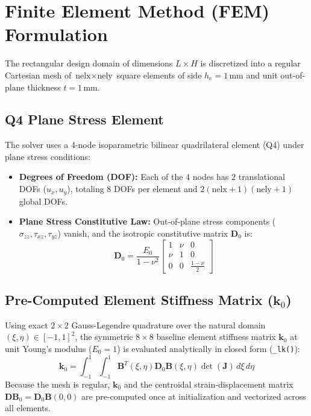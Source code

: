 \documentclass[11pt, a4paper]{article}
\begin{document}
\section{Finite Element Method (FEM) Formulation}
The rectangular design domain of dimensions $L \times H$ is discretized into a regular Cartesian mesh of $\text{nelx} \times \text{nely}$ square elements of side $h_e = 1\,\text{mm}$ and unit out-of-plane thickness $t = 1\,\text{mm}$.

\subsection{Q4 Plane Stress Element}
The solver uses a 4-node isoparametric bilinear quadrilateral element (Q4) under plane stress conditions:
\begin{itemize}
    \item \textbf{Degrees of Freedom (DOF):} Each of the 4 nodes has 2 translational DOFs ($u_x, u_y$), totaling 8 DOFs per element and $2(\text{nelx}+1)(\text{nely}+1)$ global DOFs.
    \item \textbf{Plane Stress Constitutive Law:} Out-of-plane stress components ($\sigma_{zz}, \tau_{xz}, \tau_{yz}$) vanish, and the isotropic constitutive matrix $\mathbf{D}_0$ is:
    \begin{equation}
        \mathbf{D}_0 = \frac{E_0}{1 - \nu^2}
        \begin{bmatrix}
        1 & \nu & 0 \\
        \nu & 1 & 0 \\
        0 & 0 & \frac{1-\nu}{2}
        \end{bmatrix}
    \end{equation}
\end{itemize}

\subsection{Pre-Computed Element Stiffness Matrix ($\mathbf{k}_0$)}
Using exact $2 \times 2$ Gauss-Legendre quadrature over the natural domain $(\xi, \eta) \in [-1, 1]^2$, the symmetric $8 \times 8$ baseline element stiffness matrix $\mathbf{k}_0$ at unit Young's modulus ($E_0 = 1$) is evaluated analytically in closed form (\texttt{\_lk()}):
\begin{equation}
    \mathbf{k}_0 = \int_{-1}^1 \int_{-1}^1 \mathbf{B}^T(\xi,\eta) \mathbf{D}_0 \mathbf{B}(\xi,\eta) \det(\mathbf{J}) \, d\xi \, d\eta
\end{equation}
Because the mesh is regular, $\mathbf{k}_0$ and the centroidal strain-displacement matrix $\mathbf{D}\mathbf{B}_0 = \mathbf{D}_0 \mathbf{B}(0,0)$ are pre-computed once at initialization and vectorized across all elements.
\end{document}
